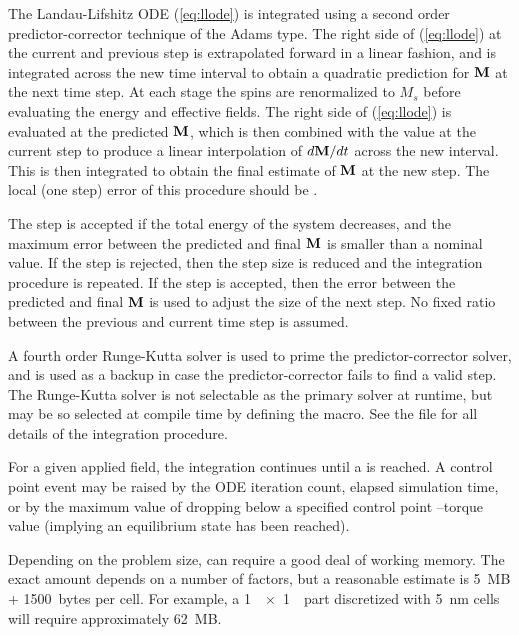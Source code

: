 The Landau-Lifshitz ODE (\ref{eq:llode}) is
integrated using a second order
predictor-corrector technique of the
Adams type.  The right side of (\ref{eq:llode}) at the current and
previous step is extrapolated forward in a linear fashion, and is
integrated across the new time interval to obtain a quadratic prediction
for $\textbf{M}$ at the next time step.  At each stage the spins are
renormalized to $M_s$ before evaluating the energy and effective
fields.  The right side of (\ref{eq:llode}) is evaluated at the
predicted $\textbf{M}$, which is then combined with the value at the current
step to produce a linear interpolation of $d\textbf{M}/dt$ across the new
interval.  This is then integrated to obtain the final estimate of $\textbf{M}$
at the new step.  The local (one step) error of this procedure should be
.

The step is accepted if the total energy of the system decreases, and
the maximum error between the predicted and final $\textbf{M}$ is smaller than
a nominal value.  If the step is rejected, then the step size is reduced
and the integration procedure is repeated.  If the step is accepted,
then the error between the predicted and final $\textbf{M}$ is used to adjust
the size of the next step.  No fixed ratio between the previous and
current time step is assumed.

A fourth order Runge-Kutta solver is used to
prime the predictor-corrector solver, and is used as a backup in case
the predictor-corrector fails to find a valid step.  The Runge-Kutta
solver is not selectable as the primary solver at runtime, but may be so
selected at compile time by defining the  macro.
See the file  for all details of the
integration procedure.

For a given applied field, the integration continues until a
 is
reached.  A control point event may
be raised by the ODE iteration count, elapsed simulation time, or by the
maximum value of {}
{} dropping below a
specified control point --torque value (implying an equilibrium state
has been reached).

Depending on the problem size,  can require a good deal
of working memory.  The exact amount depends on a number of factors, but
a reasonable estimate is 5~MB + 1500~bytes per cell.  For example, a
1~\micrometer~$\times$~1~\micrometer\ part discretized with 5~nm cells will require
approximately 62~MB.

